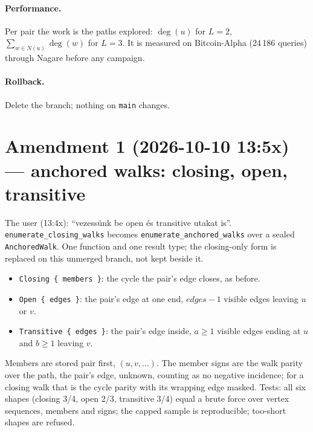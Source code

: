 \documentclass[10pt]{article}
\begin{document}
\paragraph{Performance.} Per pair the work is the paths explored: $\deg(u)$ for $L=2$, $\sum_{w\in N(u)}\deg(w)$ for
$L=3$. It is measured on Bitcoin-Alpha (24\,186 queries) through Nagare before any campaign.
\paragraph{Rollback.} Delete the branch; nothing on \texttt{main} changes.

\section*{Amendment 1 (2026-10-10 13:5x) --- anchored walks: closing, open, transitive}
The user (13:4x): ``vezess\"unk be open \'es transitive utakat is''. \texttt{enumerate\_closing\_walks} becomes
\texttt{enumerate\_anchored\_walks} over a sealed \texttt{AnchoredWalk}. One function and one result type; the
closing-only form is replaced on this unmerged branch, not kept beside it.
\begin{itemize}
\item \texttt{Closing \{ members \}}: the cycle the pair's edge closes, as before.
\item \texttt{Open \{ edges \}}: the pair's edge at one end, $edges-1$ visible edges leaving $u$ or $v$.
\item \texttt{Transitive \{ edges \}}: the pair's edge inside, $a\ge1$ visible edges ending at $u$ and $b\ge1$ leaving
  $v$.
\end{itemize}
Members are stored pair first, $(u, v, \dots)$. The member signs are the walk parity over the path, the pair's edge,
unknown, counting as no negative incidence; for a closing walk that is the cycle parity with its wrapping edge
masked. Tests: all six shapes (closing 3/4, open 2/3, transitive 3/4) equal a brute force over vertex sequences,
members and signs; the capped sample is reproducible; too-short shapes are refused.


\end{document}
